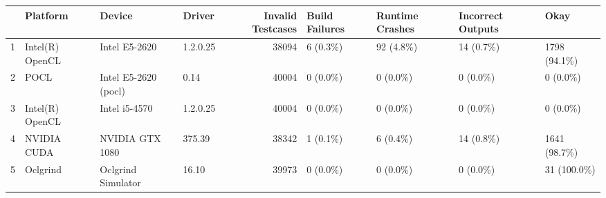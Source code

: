 \begin{tabular}{llllrllll}
\toprule
{} &         Platform &                Device &    Driver &  Invalid Testcases & Build Failures & Runtime Crashes & Incorrect Outputs &           Okay \\
\midrule
1 &  Intel(R) OpenCL &         Intel E5-2620 &  1.2.0.25 &              38094 &      6  (0.3\%) &      92  (4.8\%) &        14  (0.7\%) &  1798  (94.1\%) \\
2 &             POCL &  Intel E5-2620 (pocl) &      0.14 &              40004 &      0  (0.0\%) &       0  (0.0\%) &         0  (0.0\%) &      0  (0.0\%) \\
3 &  Intel(R) OpenCL &         Intel i5-4570 &  1.2.0.25 &              40004 &      0  (0.0\%) &       0  (0.0\%) &         0  (0.0\%) &      0  (0.0\%) \\
4 &      NVIDIA CUDA &       NVIDIA GTX 1080 &    375.39 &              38342 &      1  (0.1\%) &       6  (0.4\%) &        14  (0.8\%) &  1641  (98.7\%) \\
5 &         Oclgrind &    Oclgrind Simulator &     16.10 &              39973 &      0  (0.0\%) &       0  (0.0\%) &         0  (0.0\%) &   31  (100.0\%) \\
\bottomrule
\end{tabular}
